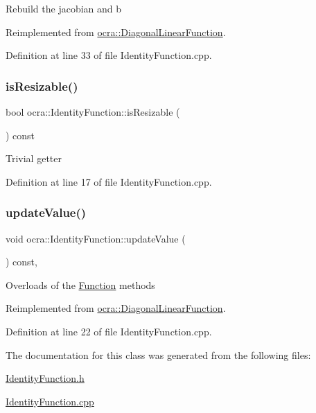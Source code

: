Rebuild the jacobian and b 

Reimplemented from \hyperlink{classocra_1_1DiagonalLinearFunction_a8a51d23c302c9bad9579b95e29481f55}{ocra\+::\+Diagonal\+Linear\+Function}.



Definition at line 33 of file Identity\+Function.\+cpp.

\hypertarget{classocra_1_1IdentityFunction_aa468e3e90c544e901ed2d81f6d0eb9f3}{}\label{classocra_1_1IdentityFunction_aa468e3e90c544e901ed2d81f6d0eb9f3} 
\subsubsection{\texorpdfstring{is\+Resizable()}{isResizable()}}
{\footnotesize\ttfamily bool ocra\+::\+Identity\+Function\+::is\+Resizable (\begin{DoxyParamCaption}{ }\end{DoxyParamCaption}) const}

Trivial getter 

Definition at line 17 of file Identity\+Function.\+cpp.

\hypertarget{classocra_1_1IdentityFunction_afd77529674b7b6db3db2542aaeedbb16}{}\label{classocra_1_1IdentityFunction_afd77529674b7b6db3db2542aaeedbb16} 
\subsubsection{\texorpdfstring{update\+Value()}{updateValue()}}
{\footnotesize\ttfamily void ocra\+::\+Identity\+Function\+::update\+Value (\begin{DoxyParamCaption}{ }\end{DoxyParamCaption}) const\hspace{0.3cm}{\ttfamily [protected]}, {\ttfamily [virtual]}}

Overloads of the \hyperlink{classocra_1_1Function}{Function} methods 

Reimplemented from \hyperlink{classocra_1_1DiagonalLinearFunction_a69523347749429dae6ae041326e40d43}{ocra\+::\+Diagonal\+Linear\+Function}.



Definition at line 22 of file Identity\+Function.\+cpp.



The documentation for this class was generated from the following files\+:\begin{DoxyCompactItemize}
\item 
\hyperlink{IdentityFunction_8h}{Identity\+Function.\+h}\item 
\hyperlink{IdentityFunction_8cpp}{Identity\+Function.\+cpp}\end{DoxyCompactItemize}
